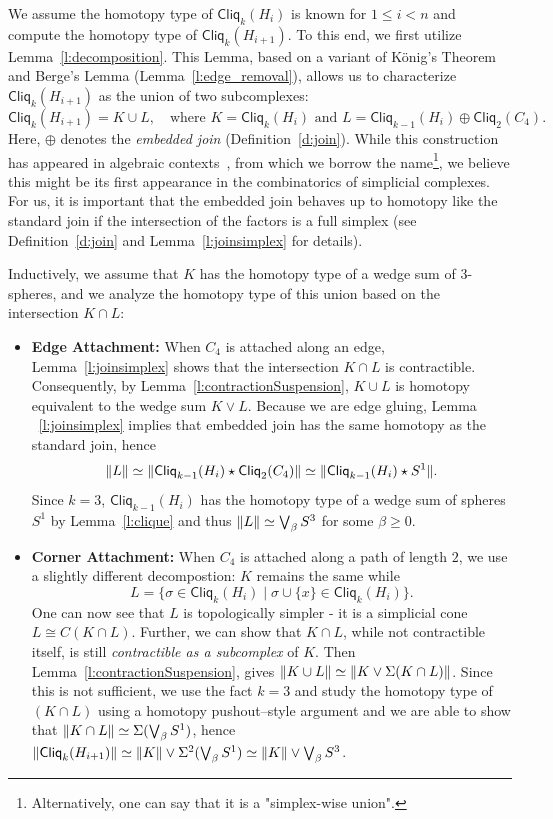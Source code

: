 \documentclass[a4paper, v2021]{lipics-v2021}
\theoremstyle{plain}
\theoremstyle{definition}
\newcommand{\Cliq}[2]{\mathsf{Cliq}_{#1}(#2)}
\DeclarePairedDelimiter{\gr}{\lVert}{\rVert}
\begin{document}
We assume the homotopy type of $\Cliq{k}{H_i}$ is known for $1 \leq i < n$ and compute the homotopy type of $\Cliq{k}{H_{i+1}}$. To this end, we first utilize Lemma~\ref{l:decomposition}. This Lemma, based on a  variant of K\"{o}nig's Theorem and Berge's Lemma (Lemma~\ref{l:edge_removal}), allows us to characterize $\Cliq{k}{H_{i+1}}$ as the union of two subcomplexes:
\[
\Cliq{k}{H_{i+1}} = K \cup L, \quad \text{where } K = \Cliq{k}{H_i} \text{ and } L = \Cliq{k-1}{H_i} \oplus \Cliq{2}{C_4}.
\]
Here, $\oplus$ denotes the \emph{embedded join} (Definition~\ref{d:join}). While this construction has appeared in algebraic contexts~\cite{SimisU2001,ChoeJ2025}, from which we borrow the name\footnote{Alternatively, one can say that it is a "simplex-wise union".}, we believe this might be its first appearance in the combinatorics of simplicial complexes. For us, it is important that the embedded join behaves up to homotopy like the standard join if the intersection of the factors is a full simplex (see Definition~\ref{d:join} and Lemma~\ref{l:joinsimplex} for details).

Inductively, we assume that $K$ has the homotopy type of a wedge sum of $3$-spheres, and we analyze the homotopy type of this union based on the intersection $K \cap L$:
\begin{itemize}
    \item \textbf{Edge Attachment:} When $C_{4}$ is attached along an edge, Lemma~\ref{l:joinsimplex} shows that the intersection $K \cap L$ is contractible. Consequently, by Lemma~\ref{l:contractionSuspension}, $K\cup L$ is homotopy equivalent to the wedge sum $K \vee L$. 
    Because we are edge gluing, Lemma ~\ref{l:joinsimplex} implies that embedded join has the same homotopy as the standard join, hence 
    \[
    \gr{L} \simeq \gr{\Cliq{k-1}{H_i} \star \Cliq{2}{C_4}} \simeq \gr{\Cliq{k-1}{H_i} \star S^1}.\] 
    Since $k = 3$, $\Cliq{k-1}{H_i}$ has the homotopy type of a wedge sum of spheres $S^1$ by Lemma~\ref{l:clique} and thus $\gr{L}\simeq \bigvee_\beta S^3$ for some $\beta\geq 0$.
    \item \textbf{Corner Attachment:} When $C_{4}$ is attached along a path of length $2$, we use a slightly different decompostion: $K$ remains the same while \[ L = \{\sigma \in \Cliq{k}{H_i} \mid \sigma \cup \{x\} \in \Cliq{k}{H_i}\}. \] One can now see that $L$ is topologically simpler - it is a simplicial cone $L \cong C(K\cap L)$. Further, we can show that $K \cap L$, while not contractible itself, is still \emph{contractible as a subcomplex} of $K$. Then Lemma~\ref{l:contractionSuspension}, gives $ \gr{K\cup L} \simeq \gr{K \vee \Sigma(K \cap L)}$. Since this is not sufficient, we use the fact $k = 3$ and study the homotopy type of $(K \cap L)$ using a homotopy pushout--style argument and we are  able to show that $\gr{K\cap L} \simeq \Sigma (\bigvee_\beta S^1)$, hence  $\gr{\Cliq{k}{H_{i+1}}} \simeq  \gr{K} \vee \Sigma^2 (\bigvee_\beta S^1)\simeq \gr{K} \vee \bigvee_\beta S^3$.
\end{itemize}
 
\end{document}
